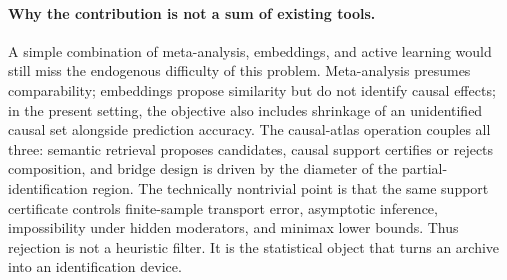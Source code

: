 \documentclass[11pt]{article}
\numberwithin{equation}{section}
\newcommand{\1}{\mathbf 1}
\begin{document}
\paragraph{Why the contribution is not a sum of existing tools.}
A simple combination of meta-analysis, embeddings, and active learning would still miss the endogenous difficulty of this problem.  Meta-analysis presumes comparability; embeddings propose similarity but do not identify causal effects; in the present setting, the objective also includes shrinkage of an unidentified causal set alongside prediction accuracy.  The causal-atlas operation couples all three: semantic retrieval proposes candidates, causal support certifies or rejects composition, and bridge design is driven by the diameter of the partial-identification region.  The technically nontrivial point is that the same support certificate controls finite-sample transport error, asymptotic inference, impossibility under hidden moderators, and minimax lower bounds.  Thus rejection is not a heuristic filter.  It is the statistical object that turns an archive into an identification device.
\end{document}
